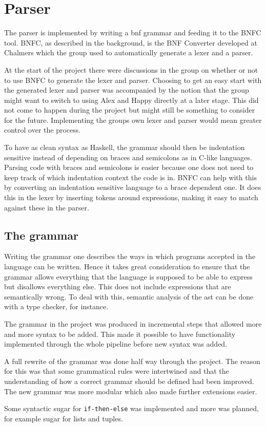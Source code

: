 \section{Parser}

The parser is implemented by writing a \gls{bnf} grammar and feeding it to the BNFC\cite{bnfc} tool. BNFC, as described in the background, is the BNF Converter developed at Chalmers which the group used to automatically generate a lexer and a parser.

At the start of the project there were discussions in the group on whether or not to use BNFC to generate the lexer and parser. Choosing to get an easy start with the generated lexer and parser was accompanied by the notion that the group might want to switch to using Alex\cite{alex} and Happy\cite{happy} directly at a later stage. This did not come to happen during the project but might still be something to consider for the future. Implementing the groups own lexer and parser would mean greater control over the process.

To have as clean syntax as Haskell, the grammar should then be indentation sensitive instead of depending on braces and semicolons as in C-like languages. Parsing code with braces and semicolons is easier because one does not need to keep track of which indentation context the code is in. BNFC can help with this by converting an indentation sensitive language to a brace dependent one. It does this in the lexer by inserting tokens around expressions, making it easy to match against these in the parser.

\subsection{The grammar}

Writing the grammar one describes the ways in which programs accepted in the language can be written. Hence it takes great consideration to ensure that the grammar allows everything that the language is supposed to be able to express but disallows everything else. This does not include expressions that are semantically wrong. To deal with this, semantic analysis of the \gls{ast} can be done with a type checker, for instance. 

The grammar in the project was produced in incremental steps that allowed more and more syntax to be added. This made it possible to have functionality implemented through the whole pipeline before new syntax was added. 

A full rewrite of the grammar was done half way through the project. The reason for this was that some grammatical rules were intertwined and that the understanding of how a correct grammar should be defined had been improved. The new grammar was more modular which also made further extensions easier.

Some syntactic sugar for \texttt{if-then-else} was implemented and more was planned, for example sugar for lists and tuples.
